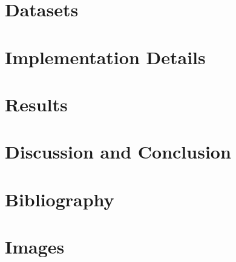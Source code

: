 \documentclass[journal]{IEEEtran}
\begin{document}


\section{Datasets}



\section{Implementation Details}



\section{Results}



\section{Discussion and Conclusion}



\section{Bibliography}



\section{Images}


\end{document}
